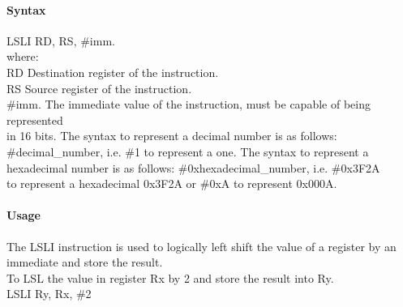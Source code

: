 \documentclass[12pt]{article}
\begin{document}
    \paragraph{Syntax}
    \begin{flushleft}
    LSLI RD, RS, \#imm.\\
    \vspace{1em}        %
    where:\\
    \vspace{1em}
    RD  \hspace{3.6em} Destination register of the instruction.\\
    \vspace{1em}
    RS  \hspace{3.85em} Source register of the instruction.\\
    \vspace{1em}
    \#imm.  \hspace{1.8em} The immediate value of the instruction, must be capable of being represented\\             \hspace{5.4em} in 16 bits. The syntax to represent a decimal number is as follows:\\
            \hspace{5.4em} \#decimal\_number, i.e. \#1 to represent a one. The syntax to represent a\\
            \hspace{5.4em} hexadecimal number is as follows: \#0xhexadecimal\_number, i.e. \#0x3F2A \\
            \hspace{5.4em} to represent a hexadecimal 0x3F2A or \#0xA to represent 0x000A.\\
    \end{flushleft}
    
    \paragraph{Usage}
    \begin{flushleft}
    The LSLI instruction is used to logically left shift the value of a register by an immediate and store the result.\\ 
    \vspace{1em}
    To LSL the value in register Rx by 2 and store the result into Ry.\\
    \vspace{1em}
    LSLI Ry, Rx, \#2
    \end{flushleft}
    
\end{document}
